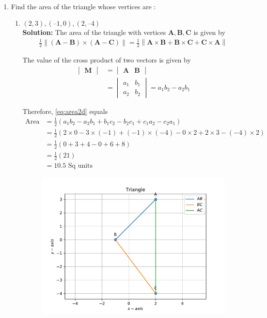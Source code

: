 \documentclass[12pt]{article}
\newcommand{\mydet}[1]{\ensuremath{\begin{vmatrix}#1\end{vmatrix}}}
\providecommand{\brak}[1]{\ensuremath{\left(#1\right)}}
\providecommand{\norm}[1]{\left\lVert#1\right\rVert}
\newcommand{\solution}{\noindent \textbf{Solution: }}
\let\vec\mathbf
\begin{document}
\begin{enumerate}
\item Find the area of the triangle whose vertices are :
\begin{enumerate}
\item $(2, 3), (–1, 0), (2, – 4)$  \\
\solution The area of the triangle with vertices $\vec{A}, \vec{B}, \vec{C}$ is given by  
  \label{prop:area2d}
  \begin{align}
    \label{eq:area2d}
	\frac{1}{2}\norm{\brak{\vec{A}-\vec{B}} \times \brak{\vec{A}-\vec{C}}}
 = 
 \frac{1}{2}\norm{\vec{A} \times \vec{B}+\vec{B} \times \vec{C}+\vec{C} \times \vec{A}}
\end{align}

The value of the cross product of two vectors is given by \\

\begin{align}
  \label{eq:det2d}
  \mydet{\vec{M}} &= \mydet{\vec{A} & \vec{B}} 
  \\
  &= \mydet{a_1 & b_1\\a_2 & b_2} = a_1b_2 - a_2 b_1
\end{align}

		Therefore, \eqref{eq:area2d} equals \\
\begin{align}
	\text{Area} &=	\frac{1}{2}\brak{a_1b_2 - a_2 b_1 + b_1c_2 - b_2 c_1 + c_1a_2 - c_2 a_1}  \\
	&=	\frac{1}{2}\brak{2 \times 0 - 3 \times \brak{-1} + \brak{-1}\times \brak{-4} - 0 \times 2 + 2 \times 3 - \brak{-4} \times 2}  \\
	&=\frac{1}{2}\brak{0 + 3  + 4 - 0 + 6 + 8} \\
	&=\frac{1}{2}\brak{21}  \\
	&=10.5 \text{ Sq units}	       
\end{align}

\begin{figure}[!h]
	\begin{center}
		\includegraphics[width=\columnwidth]{./figs/problem1a.pdf}
	\end{center}
\caption{}
\label{fig:Fig1}
\end{figure}


\end{enumerate}
\end{enumerate}
\end{document}
